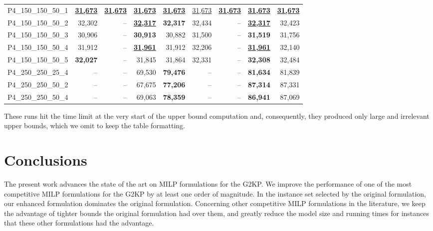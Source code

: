 \documentclass[ppgc,prop-tese,english,formais,babel]{iiufrgs}
\begin{document}
\begin{table}
\begin{tabular}{lrrrrrrrr}
P4\_150\_150\_50\_1 & \underline{\textbf{31,673}} & \underline{\textbf{31,673}} & \underline{\textbf{31,673}} & \underline{\textbf{31,673}} & \underline{31,673} & \underline{\textbf{31,673}} & \underline{\textbf{31,673}} & \underline{\textbf{31,673}} \\
P4\_150\_150\_50\_2 & 32,302 & -- & \underline{\textbf{32,317}} & \textbf{32,317} & 32,434 & -- & \underline{\textbf{32,317}} & 32,423 \\
P4\_150\_150\_50\_3 & 30,906 & -- & \textbf{30,913} & 30,882 & 31,500 & -- & \textbf{31,519} & 31,756 \\
P4\_150\_150\_50\_4 & 31,912 & -- & \underline{\textbf{31,961}} & 31,912 & 32,206 & -- & \underline{\textbf{31,961}} & 32,140 \\
P4\_150\_150\_50\_5 & \textbf{32,027} & -- & 31,845 & 31,864 & 32,331 & -- & \textbf{32,308} & 32,484 \\
P4\_250\_250\_25\_4 & -- & -- & 69,530 & \textbf{79,476} & -- & -- & \textbf{81,634} & 81,839 \\
P4\_250\_250\_50\_2 & -- & -- & 67,675 & \textbf{77,206} & -- & -- & \textbf{87,314} & 87,331 \\
P4\_250\_250\_50\_4 & -- & -- & 69,063 & \textbf{78,359} & -- & -- & \textbf{86,941} & 87,069 \\\hline\hline
\end{tabular}
\break\textbf{\large \textasteriskcentered} These runs hit the time limit at the very start of the upper bound computation and, consequently, they produced only large and irrelevant upper bounds, which we omit to keep the table formatting.
\label{tab:velasco_new_results}
\end{table}

\chapter{Conclusions}
\label{sec:conclusions}

The present work advances the state of the art on MILP formulations for the G2KP.
We improve the performance of one of the most competitive MILP formulations for the G2KP by at least one order of magnitude.
In the instance set selected by the original formulation, our enhanced formulation dominates the original formulation.
Concerning other competitive MILP formulations in the literature, we keep the advantage of tighter bounds the original formulation had over them, and greatly reduce the model size and running times for instances that these other formulations had the advantage.
\end{document}
